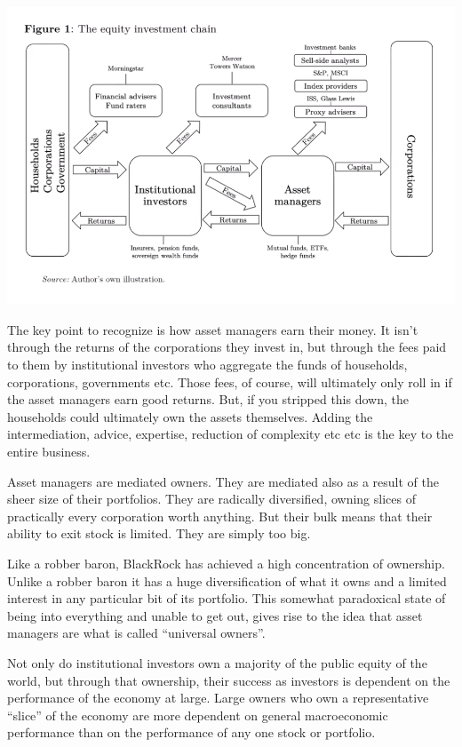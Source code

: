 \documentclass[
]{book}
\begin{document}
\includegraphics{fig/asset_manager_capitalism.png}

The key point to recognize is how asset managers earn their money. It isn't through the returns of the corporations they invest in, but through the fees paid to them by institutional investors who aggregate the funds of households, corporations, governments etc.
Those fees, of course, will ultimately only roll in if the asset managers earn good returns. But, if you stripped this down, the households could ultimately own the assets themselves. Adding the intermediation, advice, expertise, reduction of complexity etc etc is the key to the entire business.

Asset managers are mediated owners. They are mediated also as a result of the sheer size of their portfolios. They are radically diversified, owning slices of practically every corporation worth anything. But their bulk means that their ability to exit stock is limited. They are simply too big.

Like a robber baron, BlackRock has achieved a high concentration of ownership. Unlike a robber baron it has a huge diversification of what it owns and a limited interest in any particular bit of its portfolio. This somewhat paradoxical state of being into everything and unable to get out, gives rise to the idea that asset managers are what is called ``universal owners''.

Not only do institutional investors own a majority of the public equity of the world, but through that ownership, their success as investors is dependent on the performance of the economy at large. Large owners who own a representative ``slice'' of the economy are more dependent on general macroeconomic performance than on the performance of any one stock or portfolio.
\end{document}
